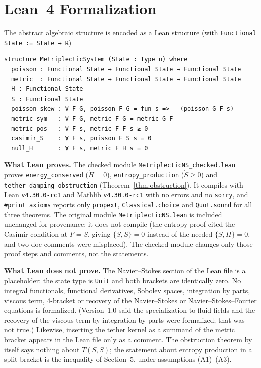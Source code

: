 \documentclass[11pt,a4paper]{article}
\begin{document}
\section{Lean~4 Formalization}
The abstract algebraic structure is encoded as a Lean structure (with \texttt{Functional State := State → ℝ})
\begin{verbatim}
structure MetriplecticSystem (State : Type u) where
  poisson : Functional State → Functional State → Functional State
  metric  : Functional State → Functional State → Functional State
  H : Functional State
  S : Functional State
  poisson_skew : ∀ F G, poisson F G = fun s => - (poisson G F s)
  metric_sym   : ∀ F G, metric F G = metric G F
  metric_pos   : ∀ F s, metric F F s ≥ 0
  casimir_S    : ∀ F s, poisson F S s = 0
  null_H       : ∀ F s, metric F H s = 0
\end{verbatim}
\noindent\textbf{What Lean proves.} The checked module \texttt{MetriplecticNS\_checked.lean} proves \texttt{energy\_conserved} (\(\dot H=0\)), \texttt{entropy\_production} (\(\dot S\ge0\)) and \texttt{tether\_damping\_obstruction} (Theorem~\ref{thm:obstruction}). It compiles with Lean \texttt{v4.30.0-rc1} and Mathlib \texttt{v4.30.0-rc1} with no errors and no \texttt{sorry}, and \texttt{\#print axioms} reports only \texttt{propext}, \texttt{Classical.choice} and \texttt{Quot.sound} for all three theorems. The original module \texttt{MetriplecticNS.lean} is included unchanged for provenance; it does not compile (the entropy proof cited the Casimir condition at \(F=S\), giving \(\{S,S\}=0\) instead of the needed \(\{S,H\}=0\), and two doc comments were misplaced). The checked module changes only those proof steps and comments, not the statements.

\noindent\textbf{What Lean does not prove.} The Navier--Stokes section of the Lean file is a placeholder: the state type is \texttt{Unit} and both brackets are identically zero. No integral functionals, functional derivatives, Sobolev spaces, integration by parts, viscous term, 4-bracket or recovery of the Navier--Stokes or Navier--Stokes--Fourier equations is formalized. (Version~1.0 said the specialization to fluid fields and the recovery of the viscous term by integration by parts were formalized; that was not true.) Likewise, inserting the tether kernel as a summand of the metric bracket appears in the Lean file only as a comment. The obstruction theorem by itself says nothing about \(T(S,S)\); the statement about entropy production in a split bracket is the inequality of Section~5, under assumptions (A1)--(A3).
\end{document}
